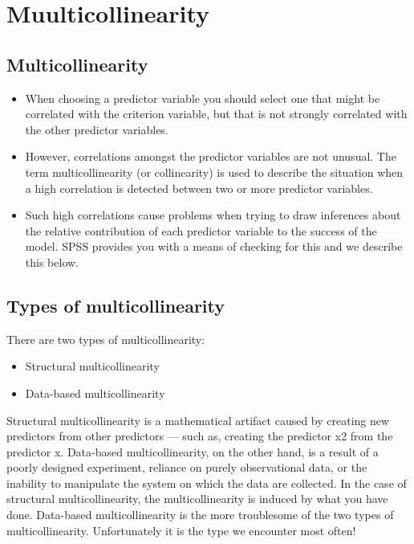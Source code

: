\documentclass[a4paper,12pt]{article}
\begin{document}
	
	\tableofcontents
	\newpage
	\section{Muulticollinearity}



\subsection{Multicollinearity}
\begin{itemize}
\item When choosing a predictor variable you should select one that might be correlated with the criterion variable, but that is not strongly correlated with the other predictor variables.
\item However, correlations amongst the predictor variables are not unusual. The term multicollinearity (or collinearity) is used to describe the situation
when a high correlation is detected between two or more predictor variables.
\item Such high correlations cause problems when trying to draw inferences about the relative contribution of each predictor variable to the success of the model. SPSS provides you with a means of checking for this and we describe this below.
\end{itemize}

\subsection{Types of multicollinearity}


There are two types of multicollinearity: 
\begin{itemize}
	\item Structural multicollinearity
	\item Data-based multicollinearity
\end{itemize}
Structural multicollinearity is a mathematical artifact caused by creating new predictors from other predictors — such as, creating the predictor x2 from the predictor x. 
Data-based multicollinearity, on the other hand, is a result of a poorly designed experiment, reliance on purely observational data, or the inability to manipulate the system on which the data are collected. 
In the case of structural multicollinearity, the multicollinearity is induced by what you have done. Data-based multicollinearity is the more troublesome of the two types of multicollinearity. Unfortunately it is the type we encounter most often!
\end{document}
